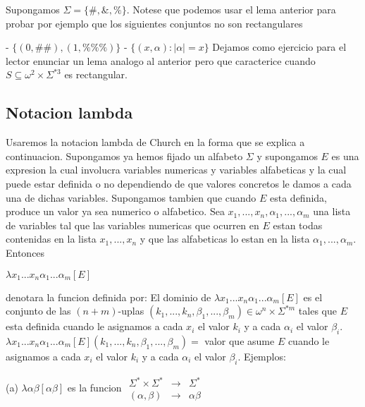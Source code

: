 Supongamos \(\Sigma =\{\#,\& ,\%\}\). Notese que podemos usar el lema anterior para probar por ejemplo que los siguientes conjuntos no son rectangulares

- \(\{(0,\#\#),(1,\%\%\%)\}\)
- \(\{(x,\alpha ):\left\vert \alpha \right\vert =x\}\)
Dejamos como ejercicio para el lector enunciar un lema analogo al anterior pero que caracterice cuando \(S\subseteq \omega ^{2}\times \Sigma ^{\ast 3}\) es rectangular.

\subsection{Notacion lambda}

Usaremos la notacion lambda de Church en la forma que se explica a continuacion. Supongamos ya hemos fijado un alfabeto \(\Sigma \) y supongamos \( E\) es una expresion la cual involucra variables numericas y variables alfabeticas y la cual puede estar definida o no dependiendo de que valores concretos le damos a cada una de dichas variables. Supongamos tambien que cuando \(E\) esta definida, produce un valor ya sea numerico o alfabetico. Sea \(x_{1},...,x_{n},\alpha _{1},...,\alpha _{m}\) una lista de variables tal que las variables numericas que ocurren en \(E\) estan todas contenidas en la lista \(x_{1},...,x_{n}\) y que las alfabeticas lo estan en la lista \(\alpha _{1},...,\alpha _{m}.\) Entonces

\(\displaystyle \lambda x_{1}...x_{n}\alpha _{1}...\alpha _{m}\left[ E\right] \)

denotara la funcion definida por:
El dominio de \(\lambda x_{1}...x_{n}\alpha _{1}...\alpha _{m}\left[ E \right] \) es el conjunto de las \((n+m)\)-uplas \((k_{1},...,k_{n},\beta _{1},...,\beta _{m})\in \omega ^{n}\times \Sigma ^{\ast m}\) tales que \(E\) esta definida cuando le asignamos a cada \(x_{i}\) el valor \(k_{i}\) y a cada \( \alpha _{i}\) el valor \(\beta _{i}.\)
\(\lambda x_{1}...x_{n}\alpha _{1}...\alpha _{m}\left[ E\right] (k_{1},...,k_{n},\beta _{1},...,\beta _{m})=\) valor que asume \(E\) cuando le asignamos a cada \(x_{i}\) el valor \(k_{i}\) y a cada \(\alpha _{i}\) el valor \( \beta _{i}.\)
Ejemplos:

(a) \(\lambda \alpha \beta \left[ \alpha \beta \right] \) es la funcion
\(\displaystyle \begin{array}{rll} \Sigma ^{\ast }\times \Sigma ^{\ast } & \rightarrow & \Sigma ^{\ast } \\ (\alpha ,\beta ) & \rightarrow & \alpha \beta \end{array} \)

